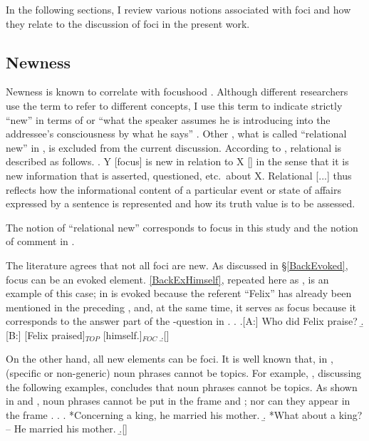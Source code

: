 In the following sections,
I review various notions associated with foci
and how they relate to the discussion of foci in the present work.

\subsection{Newness}

Newness is known to correlate with focushood \cite[]{li76,givon83,halliday04}.
Although different researchers use the term  to refer to different concepts,
I use this term to indicate strictly ``new'' in terms of  or ``what the speaker assumes he is introducing into the addressee's consciousness by what he says'' \cite[30]{chafe76}.
Other , what is called ``relational new'' in ,
is excluded from the current discussion.
According to , relational  is described as follows.
%
\ex. Y [focus] is new in relation to X [] in the sense that
     it is new information that is asserted, questioned, etc.~about X.
     Relational [...]  thus reflects how the informational content of a particular event or state of affairs expressed by a sentence is represented and how its truth value is to be assessed.

The notion of ``relational new'' corresponds to focus in this study and the notion of comment in .


The literature agrees that
not all foci are new.
As discussed in \S \ref{BackEvoked},
focus can be an evoked element.
\ref{BackExHimself}, repeated here as \Next,
is an example of this case;
 in \Next[B] is evoked because the referent ``Felix'' has already been mentioned in the preceding  \Next[A],
and, at the same time, it serves as focus because it corresponds to the answer part of the -question in \Next[A].
%
\ex. \a.[A:] Who did Felix praise?
     \b.[B:] [Felix praised]$_{TOP}$ [himself.]$_{FOC}$
     \b.[] \hfill{\cite[72, style modified by NN]{reinhart81}}


On the other hand,
all new elements can be foci.
It is well known that, in , (specific or non-generic)  noun phrases cannot be topics.
For example, , discussing the following examples,
concludes that  noun phrases cannot be topics.
As shown in \Next[a] and \NNext[a],
 noun phrases cannot be put in the frame  and ;
nor can they appear in the frame .
%
\ex. 
  \a. *Concerning a  king, he married his mother.
  \b. *What about a  king? -- He married his mother.
  \b.[] \hfill{\cite[54]{gundel74}}

